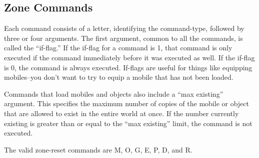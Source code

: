 \documentclass[11pt]{article}
\begin{document}
\subsection{Zone Commands}
Each command consists of a letter, identifying the command-type, followed by three or four arguments.  The first argument, common to all the commands, is called the ``if-flag.''  If the if-flag for a command is 1, that command is only executed if the command immediately before it was executed as well.  If the if-flag is 0, the command is always executed.  If-flags are useful for things like equipping mobiles--you don't want to try to equip a mobile that has not been loaded.
\par
Commands that load mobiles and objects also include a ``max existing'' argument.  This specifies the maximum number of copies of the mobile or object that are allowed to exist in the entire world at once.  If the number currently existing is greater than or equal to the ``max existing'' limit, the command is not executed.
\par
The valid zone-reset commands are M, O, G, E, P, D, and R.
\end{document}
